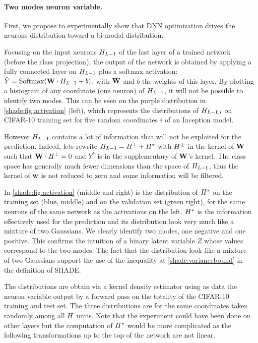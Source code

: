 \paragraph{Two modes neuron variable.} First, we propose to experimentally show that \ac{DNN} optimization drives the neurons distribution toward a bi-modal distribution.

Focusing on the input neurons $H_{L-1}$ of the last layer of a trained network (before the class projection), the output of the network is obtained by applying a fully connected layer on $H_{L-1}$ plus a softmax activation: $\hat{Y} = \mathrm{Softmax}(\mathbf{W} \cdot H_{L-1} + b)$, with $\mathbf{W}$ and $b$ the weights of this layer. By plotting a histogram of any coordinate (one neuron) of $H_{L-1}$, it will not be possible to identify two modes. This can be seen on the purple distribution in \autoref{shade:fig:activation} (left), which represents the distributions of $H_{L-1,i}$ on CIFAR-10 training set for five random coordinates $i$ of an Inception model.

However $H_{L-1}$ contains a lot of information that will not be exploited for the prediction. Indeed, lets rewrite $H_{L-1} = H^{\bot} + H^*$ with $H^{\bot}$ in the kernel of $\mathbf{W}$ such that $\mathbf{W}\cdot H^{\bot}=0$ and $Y^*$ is in the supplementary of $\mathbf{W}$'s kernel. The class space has generally much fewer dimensions than the space of $H_{L-1}$, thus the kernel of $\mathbf{w}$ is not reduced to zero and some information will be filtered.

In \autoref{shade:fig:activation} (middle and right) is the distribution of $H^*$ on the training set (blue, middle) and on the validation set (green right), for the same neurons of the same network as the activations on the left. $H^*$ is the information effectively used for the prediction and its distribution look very much like a mixture of two Gaussians. We clearly identify two modes, one negative and one positive. This confirms the intuition of a binary latent variable $Z$ whose values correspond to the two modes. The fact that the distribution look like a mixture of two Gaussians support the use of the inequality at \autoref{shade:variancebound} in the definition of SHADE.

The distributions are obtain via a kernel density estimator using as data the neuron variable output by a forward pass on the totality of the CIFAR-10 training and test set. The three distributions are for the same coordinates taken randomly among all $H$ units. Note that the experiment could have been done on other layers but the computation of $H^*$ would be more complicated as the following transformations up to the top of the network are not linear.


